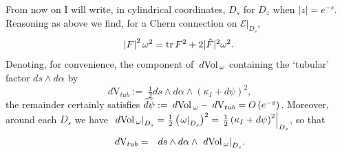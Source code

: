 \documentclass{article}
\newcommand{\func}[1]{\textnormal {#1\,}}
\newcommand{\dvol}{\:d\func{Vol}_\omega}
\newcommand{\dvtub}{\:d\text{V}_{tub}}
\begin{document}
From now on I will write, in cylindrical coordinates,  $D_s$ for $D_z$ when $\left\vert z\right\vert = e^{-s}$. Reasoning as above we find, for a Chern connection on $\left.\mathcal{E}\right\vert_{D_s}$,%
\begin{equation}       \label{Eq energy bound on surface Ds}
\left\vert F\right\vert ^{2}\omega ^{2}=\func{tr}F^{2}
+2\vert \hat{F}\vert ^{2}\omega ^{2}.
\end{equation}
Denoting, for convenience, the component of $\dvol$ containing the `tubular' factor $ds\wedge d\alpha$ by   
$$
\dvtub:=\; \tfrac{1}{2} ds\wedge d\alpha
        \wedge \left(\kappa_I +d\psi \right)^2,
$$
the remainder certainly satisfies  $\widetilde{d\psi}:=\dvol-\dvtub=O\left(e^{-s}\right)$. Moreover, around each $D_s$ we have
$\displaystyle
        {\left.\dvol\right\vert_{D_s}} 
        = \tfrac{1}{2}\left(\left.\omega\right\vert_{D_s}\right)^2 
        = \left.\tfrac{1}{2}\left(\kappa_I +d\psi \right)^2 \right\vert_{D_s}
$,
so that 
\begin{eqnarray}        \label{eq tubular decomp volume forms}
        \dvtub&=&ds\wedge d\alpha\wedge{\left.\dvol\right\vert_{D_s}}.
\end{eqnarray}
\end{document}

